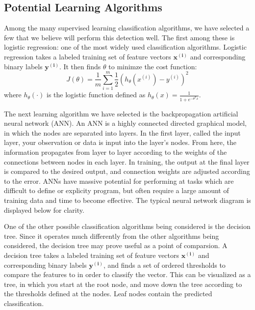 \subsection{Potential Learning Algorithms}

Among the many supervised learning classification algorithms, we have selected a few that we believe will perform this detection well.
The first among these is logistic regression: one of the most widely used classification algorithms.
Logistic regression takes a labeled training set of feature vectors $\mathbf{x^{(i)}}$ and corresponding binary labels $\mathbf{y^{(i)}}$.
It then finds $\theta$ to minimze the cost function:
\begin{equation}
J(\theta) = \frac{1}{m} \sum_{i=1}^m\frac{1}{2} \left( h_\theta \left( x^{(i)} \right) - y^{(i)} \right)^2
\end{equation}
where $h_\theta (\cdot)$ is the logistic function defined as $h_\theta(x) = \frac{1}{1+e^{-\theta^Tx}}$.

The next learning algorithm we have selected is the backpropagation artificial neural network (ANN).
An ANN is a highly connected directed graphical model, in which the nodes are separated into layers.
In the first layer, called the input layer, your observation or data is input into the layer's nodes.
From here, the information propagates from layer to layer according to the weights of the connections between nodes in each layer.
In training, the output at the final layer is compared to the desired output, and connection weights are adjusted according to the error.
ANNs have massive potential for performing at tasks which are difficult to define or explicity program, but often require a large amount of training data and time to become effective.
The typical neural network diagram is displayed below for clarity.

One of the other possible classification algorithms being considered is the decision tree. 
Since it operates much differently from the other algorithms being considered, the decision tree may prove useful as a point of comparsion.
A decision tree takes a labeled training set of feature vectors $\mathbf{x^{(i)}}$ and corresponding binary labels $\mathbf{y^{(i)}}$, and finds a set of ordered thresholds to compare the features to in order to classify the vector.
This can be visualized as a tree, in which you start at the root node, and move down the tree according to the thresholds defined at the nodes.
Leaf nodes contain the predicted classification.

